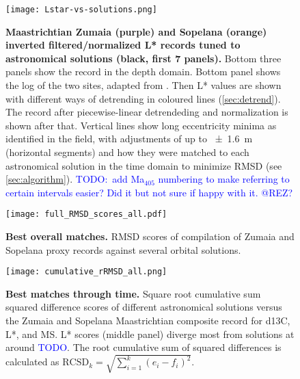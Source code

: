 \documentclass[draft]{agujournal2019}
\newcommand{\ijk}{\textcolor{blue}}
\newcommand{\ma}[1]{Ma\(_{405}\)#1}
\begin{document}
\begin{figure}[htb]
  \centering
  \texttt{[image: Lstar-vs-solutions.png]}
  \caption{\label{fig:rolling-depth-age}
    \textbf{Maastrichtian Zumaia (purple) and Sopelana (orange) inverted filtered/normalized \gls{L*} records tuned to astronomical solutions (black, first 7 panels).}
    Bottom three panels show the record in the depth domain.
    Bottom panel shows the log of the two sites, adapted from .
    Then \gls{L*} values are shown with different ways of detrending in coloured lines (\cref{sec:detrend}).
    The record after piecewise-linear detrendeding and normalization is shown after that.
    Vertical lines show long eccentricity minima as identified in the field,
    with adjustments of up to \qty{\pm1.6}{\metre} (horizontal segments)
    and how they were matched to each astronomical solution in the time domain to minimize \gls{RMSD} (see \cref{sec:algorithm}).
    \ijk{TODO:\ add \ma{} numbering to make referring to certain intervals easier? Did it but not sure if happy with it. @REZ?}
    }
\end{figure}


\begin{figure}[htb]
    \centering
    \texttt{[image: full\_RMSD\_scores\_all.pdf]}
    \caption{\label{fig:full-RMSD-all} %
      \textbf{Best overall matches.}
        \gls{RMSD} scores of compilation of Zumaia and Sopelana proxy records against several orbital solutions.
    }
\end{figure}

\begin{figure}[htb]
  \centering
  \texttt{[image: cumulative\_rRMSD\_all.png]}
  \caption{\label{fig:cum-RMSD-all}
    \textbf{Best matches through time.}
    Square root cumulative sum squared difference scores of
    different astronomical solutions versus the Zumaia and Sopelana Maastrichtian composite record
    for \gls{d13C}, \gls{L*}, and \gls{MS}.
    \gls{L*} scores (middle panel) diverge most from solutions at around \ijk{TODO}.
    The root cumulative sum of squared differences is calculated as \(\text{RCSD}_{k} = \sqrt{\sum_{i=1}^{k}(e_{i} - f_{i})^{2}}\).
  }
\end{figure}
\end{document}
